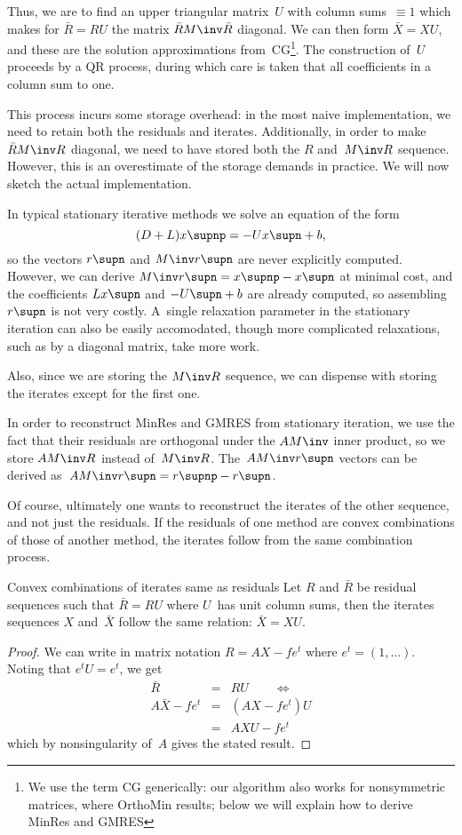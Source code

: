 Thus, we are to find an upper triangular matrix~$U$ with column
sums~$\equiv1$ which makes for $\bar R=RU$ the matrix $\bar RM\inv \bar R$
diagonal. We can then form $\bar X=XU$, and these are the solution
approximations from~CG\footnote{We use the term CG generically: our
algorithm also works for nonsymmetric matrices, where OrthoMin
results; below we will explain how to derive MinRes and GMRES}.
The construction of~$U$ proceeds by a QR process, during
which care is taken that all coefficients in a column sum to one.

This process incurs some storage overhead: in the most naive
implementation, we need to retain both the residuals and iterates.
Additionally, in order to make $\bar RM\inv R$ diagonal, we need to have
stored both the $R$ and~$M\inv R$ sequence. However, this is an
overestimate of the storage demands in practice. We will now sketch
the actual implementation.

In typical stationary iterative methods we solve an equation of the form
\[ (D+L)x\supnp=-Ux\supn+b, \]
so the vectors $r\supn$ and $M\inv r\supn$ are never explicitly
computed. However, we can derive $M\inv r\supn=x\supnp-x\supn$ at
minimal cost, and the coefficients $Lx\supn$ and $-U\supn+b$ are already
computed, so assembling $r\supn$ is not very costly. A~single
relaxation parameter in the stationary iteration can also be easily
accomodated, though more complicated relaxations, such as by a
diagonal matrix, take more work.

Also, since we are storing the
$M\inv R$ sequence, we can dispense with storing the iterates except
for the first one.

In order to reconstruct MinRes and GMRES from stationary iteration, we
use the fact that their residuals are orthogonal under the $AM\inv$
inner product, so we store $AM\inv R$ instead of~$M\inv
R$. The~$AM\inv r\supn$ vectors can be derived as~$AM\inv
r\supn=\nobreak r\supnp-\nobreak r\supn$.

Of course, ultimately one wants to reconstruct the iterates of the
other sequence, and not just the residuals.
If the residuals of one method are convex combinations of those of
another method, the iterates follow from the same combination process.
\begin{llemma}{Convex combinations of iterates same as residuals}
\label{lemma:comboX}
Let $R$ and $\bar R $ be residual sequences such that $\bar R =R U$ where
$U$~has unit column sums, then the iterates sequences $X$ and~$\bar X$
follow the same relation: $\bar X=XU$.
\end{llemma}
\begin{proof} We can write in matrix notation $R=AX-fe^t$ where
$e^t=(1,\ldots)$. Noting that $e^tU=e^t$, we get
\begin{eqnarray*}
\bar R &=&RU\qquad \Leftrightarrow\\
A\bar X-fe^t&=&(AX-fe^t)U\\
&=&AXU-fe^t
\end{eqnarray*}
which by nonsingularity of~$A$ gives the stated result.
\end{proof}

